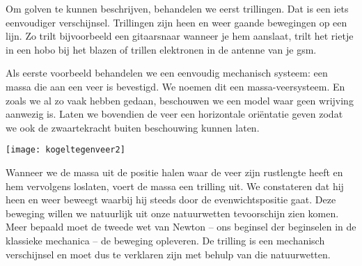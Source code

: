 \documentclass{ximera}
\begin{document}
	\author{Bart Lambregs}
    \xmsource



	Om golven te kunnen beschrijven, behandelen we eerst trillingen. Dat is een iets eenvoudiger verschijnsel. Trillingen zijn heen en weer gaande bewegingen op een lijn. Zo trilt bijvoorbeeld een gitaarsnaar wanneer je hem aanslaat, trilt het rietje in een hobo bij het blazen of trillen elektronen in de antenne van je gsm.
	

	

	
	
	
	Als eerste voorbeeld behandelen we een eenvoudig mechanisch systeem: een massa die aan een veer is bevestigd. We noemen dit een massa-veersysteem. En zoals we al zo vaak hebben gedaan, beschouwen we een model waar geen wrijving aanwezig is. Laten we bovendien de veer een horizontale ori\"entatie geven zodat we ook de zwaartekracht buiten beschouwing kunnen laten.
	\begin{image}
	
	\texttt{[image: kogeltegenveer2]}
	\end{image}
	Wanneer we de massa uit de positie halen waar de veer zijn rustlengte heeft en hem vervolgens loslaten, voert de massa een trilling uit. We constateren dat hij heen en weer beweegt waarbij hij steeds door de evenwichtspositie gaat. Deze beweging willen we natuurlijk uit onze natuurwetten tevoorschijn zien komen. Meer bepaald moet de tweede wet van Newton -- ons beginsel der beginselen in de klassieke mechanica -- de beweging opleveren. De trilling is een mechanisch verschijnsel en moet dus te verklaren zijn met behulp van die natuurwetten. 
	
\end{document}
